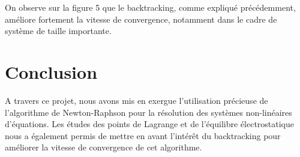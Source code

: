 \documentclass{article}
\begin{document}
On observe sur la figure 5 que le backtracking, comme expliqué précédemment, améliore fortement la vitesse de convergence, notamment dans le cadre de système de taille importante. 
\section{Conclusion}

A travers ce projet, nous avons mis en exergue l'utilisation précieuse de l'algorithme de Newton-Raphson pour la résolution des systèmes non-linéaires d'équations. Les études des points de Lagrange et de l'équilibre électrostatique nous a également permis de mettre en avant l'intérêt du backtracking pour améliorer la vitesse de convergence de cet algorithme.
\end{document}
